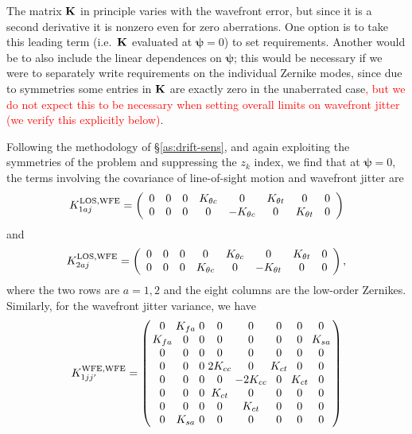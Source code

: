 \documentclass[usenatbib]{mnras}
\newcommand{\changetext}[1]{\textcolor{red}{#1}}
\begin{document}
The matrix ${\bf K}$ in principle varies with the wavefront error, but
since it is a second derivative it is nonzero even for zero
aberrations. One option is to take this leading term (i.e.\ ${\bf K}$
evaluated at ${\boldsymbol\psi}=0$) to set requirements. Another would
be to also include the linear dependences on ${\boldsymbol\psi}$; this
would be necessary if we were to separately write requirements on the
individual Zernike modes, since due to symmetries some entries in
${\bf K}$ are exactly zero in the unaberrated case\changetext{, but we do not expect this to be necessary when setting overall limits on wavefront jitter (we verify this explicitly below)}.

Following the methodology of \S\ref{as:drift-sens}, and again
exploiting the symmetries of the problem and suppressing the $z_k$
index, we find that at ${\boldsymbol\psi}=0$, the terms involving the
covariance of line-of-sight motion and wavefront jitter are
\begin{equation}
K_{1aj}^{\rm LOS,WFE} = \left( \begin{array}{cccccccc}
0 & 0 & 0 & K_{\theta c} & 0 & K_{\theta t} & 0 & 0 \\
0 & 0 & 0 & 0 & -K_{\theta c} & 0 & K_{\theta t} & 0
\end{array} \right)
\label{eq:temp.078524}
\end{equation}
and
\begin{equation}
K_{2aj}^{\rm LOS,WFE} = \left( \begin{array}{cccccccc}
0 & 0 & 0 & 0 & K_{\theta c} & 0 & K_{\theta t} & 0 \\
0 & 0 & 0 & K_{\theta c} & 0 & -K_{\theta t} & 0 & 0
\end{array} \right),
\end{equation}
where the two rows are $a=1,2$ and the eight columns are the low-order
Zernikes. Similarly, for the wavefront jitter variance, we have
\begin{equation}
\setlength\arraycolsep{1.5pt}
K_{1jj'}^{\rm WFE,WFE} = \left( \begin{array}{cccccccc}
0 & K_{fa} & 0 & 0 & 0 & 0 & 0 & 0 \\
K_{fa} & 0 & 0 & 0 & 0 & 0 & 0 & K_{sa} \\
0 & 0 & 0 & 0 & 0 & 0 & 0 & 0 \\
0 & 0 & 0 & 2K_{cc} & 0 & K_{ct} & 0 & 0 \\
0 & 0 & 0 & 0 & -2K_{cc} & 0 & K_{ct} & 0 \\
0 & 0 & 0 & K_{ct} & 0 & 0 & 0 & 0 \\
0 & 0 & 0 & 0 & K_{ct} & 0 & 0 & 0 \\
0 & K_{sa} & 0 & 0 & 0 & 0 & 0 & 0 \\
\end{array} \right)
\end{equation}
\end{document}

